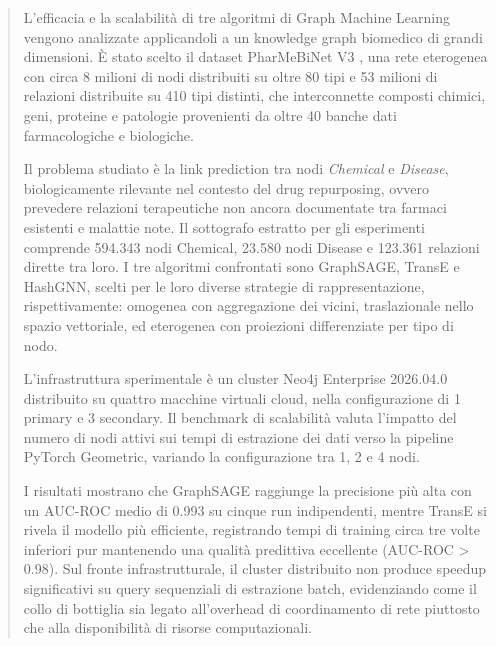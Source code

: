 \begin{abstract}

L'efficacia e la scalabilità di tre algoritmi di Graph Machine Learning vengono analizzate applicandoli a un knowledge graph biomedico di grandi dimensioni. È stato scelto il dataset PharMeBiNet V3 \cite{konigs2022pharmebinet}, una rete eterogenea con circa 8 milioni di nodi distribuiti su oltre 80 tipi e 53 milioni di relazioni distribuite su 410 tipi distinti, che interconnette composti chimici, geni, proteine e patologie provenienti da oltre 40 banche dati farmacologiche e biologiche.

Il problema studiato è la link prediction tra nodi \textit{Chemical} e \textit{Disease}, biologicamente rilevante nel contesto del drug repurposing, ovvero prevedere relazioni terapeutiche non ancora documentate tra farmaci esistenti e malattie note. Il sottografo estratto per gli esperimenti comprende 594.343 nodi Chemical, 23.580 nodi Disease e 123.361 relazioni dirette tra loro. I tre algoritmi confrontati sono GraphSAGE, TransE e HashGNN, scelti per le loro diverse strategie di rappresentazione, rispettivamente: omogenea con aggregazione dei vicini, traslazionale nello spazio vettoriale, ed eterogenea con proiezioni differenziate per tipo di nodo.

L'infrastruttura sperimentale è un cluster Neo4j Enterprise 2026.04.0 distribuito su quattro macchine virtuali cloud, nella configurazione di 1 primary e 3 secondary. Il benchmark di scalabilità valuta l'impatto del numero di nodi attivi sui tempi di estrazione dei dati verso la pipeline PyTorch Geometric, variando la configurazione tra 1, 2 e 4 nodi.

I risultati mostrano che GraphSAGE raggiunge la precisione più alta con un AUC-ROC medio di 0.993 su cinque run indipendenti, mentre TransE si rivela il modello più efficiente, registrando tempi di training circa tre volte inferiori pur mantenendo una qualità predittiva eccellente (AUC-ROC > 0.98). Sul fronte infrastrutturale, il cluster distribuito non produce speedup significativi su query sequenziali di estrazione batch, evidenziando come il collo di bottiglia sia legato all'overhead di coordinamento di rete piuttosto che alla disponibilità di risorse computazionali.
\end{abstract}